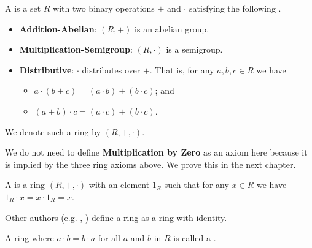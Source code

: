 \begin{definition}
    A  is a set $R$ with two binary operations $+$ and $\cdot$ satisfying the following .
    \begin{itemize}
        \item \textbf{Addition-Abelian}: $(R, +)$ is an abelian group.
        \item \textbf{Multiplication-Semigroup}: $(R, \cdot)$ is a semigroup.
        \item \textbf{Distributive}: $\cdot$ distributes over $+$. That is, for any $a, b, c \in R$ we have
        \begin{itemize}
            \item $a \cdot (b + c) = (a \cdot b) + (b \cdot c)$; and
            \item $(a + b) \cdot c = (a \cdot c) + (b \cdot c)$.
        \end{itemize}
    \end{itemize}
    We denote such a ring by $(R, +, \cdot)$.
\end{definition}
\begin{remark}
    We do not need to define \textbf{Multiplication by Zero} as an axiom here because it is implied by the three ring axioms above. We prove this in the next chapter.
\end{remark}

\begin{definition}
    A  is a ring $(R, +, \cdot)$ with an element $1_R$ such that for any $x \in R$ we have $1_R \cdot x = x \cdot 1_R = x$.
\end{definition}
\begin{remark}
    Other authors (e.g. \cite[p.~136]{cohn_1982}, \cite[pp.~145--146]{clark_1984}) define a ring as a ring with identity.
\end{remark}

\begin{definition}
    A ring where $a \cdot b = b \cdot a$ for all $a$ and $b$ in $R$ is called a .
\end{definition}


